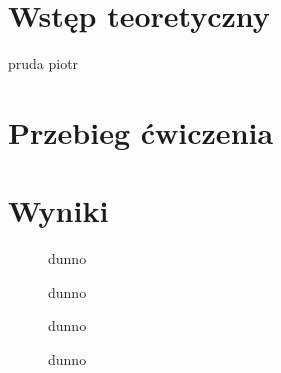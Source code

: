 \documentclass[11pt,a4paper]{article}
\begin{document}
\section{Wstęp teoretyczny}
pruda piotr
\section{Przebieg ćwiczenia}
\section{Wyniki}

\begin{figure}[H]
\centering
\resizebox{.8\linewidth}{!}{}
\caption{dunno}
\label{fig1}
\end{figure}

\begin{figure}[H]
\centering
\resizebox{.8\linewidth}{!}{}
\caption{dunno}
\label{fig1}
\end{figure}

\begin{figure}[H]
\centering
\resizebox{.8\linewidth}{!}{}
\caption{dunno}
\label{fig1}
\end{figure}

\begin{figure}[H]
\centering
\resizebox{.8\linewidth}{!}{}
\caption{dunno}
\label{fig1}
\end{figure}
\end{document}
